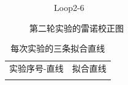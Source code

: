 \documentclass[cn,hazy,pku,12pt,normal,math=newtx,cite=super]{elegantnote}
\begin{document}
\begin{figure}[htbp]
\begin{subfigure}{0.45\textwidth}
        \caption*{Loop2-6}
    \end{subfigure}
    \caption{第二轮实验的雷诺校正图}
    \label{fig:4}
\end{figure}

\begin{center}
    \begin{longtable}{cc}
        \midrule
        \endhead

        \caption{每次实验的三条拟合直线\label{tab:4}}\\
        \toprule
        实验序号-直线 & 拟合直线 \\
        \midrule
        \endfirsthead

        \midrule
        \endfoot

        \bottomrule
        \endlastfoot
        

\end{longtable}
\end{center}
\end{document}
